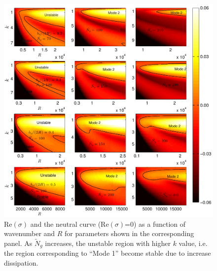 \documentclass[12pt]{report}   %
\newcommand{\Rey}{{R}}
\newcommand{\Ndg}{\tilde{N}_g}
\begin{document}
\begin{figure}
\centerline{ \includegraphics{IsotropicDragAll_imgsc4} }
\caption [ $\text{Re}(\sigma)$ and the neutral curve ($\text{Re}(\sigma)$=0) as a function of wavenumber and $\Rey$ for flow around emergent vegetation] {
$\text{Re}(\sigma)$ and the neutral curve ($\text{Re}(\sigma)$=0) as a function of wavenumber and $\Rey$ for parameters shown in the corresponding panel.  
As $\Ndg$ increases, the unstable region with higher $k$ value, i.e. the region corresponding to ``Mode 1'' become stable due to increase dissipation.
}
\label{IsotropicK_Re_sigma_set3}
\end{figure}
\end{document}
